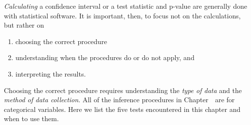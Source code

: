 \noindent \textit{Calculating} a confidence interval or a test statistic and p-value are generally done with statistical software.  It is important, then, to focus not on the calculations, but rather on 
\begin{enumerate}\vspace{-1mm}
\setlength{\itemsep}{0mm}
\item choosing the correct procedure 
\item understanding when the procedures do or do not apply, and 
\item interpreting the results.
\end{enumerate}
Choosing the correct procedure requires understanding the \textit{type of data} and the \textit{method of data collection}.    All of the inference procedures in Chapter~\thechapter~are for categorical variables.  Here we list the five tests encountered in this chapter and when to use them.  
